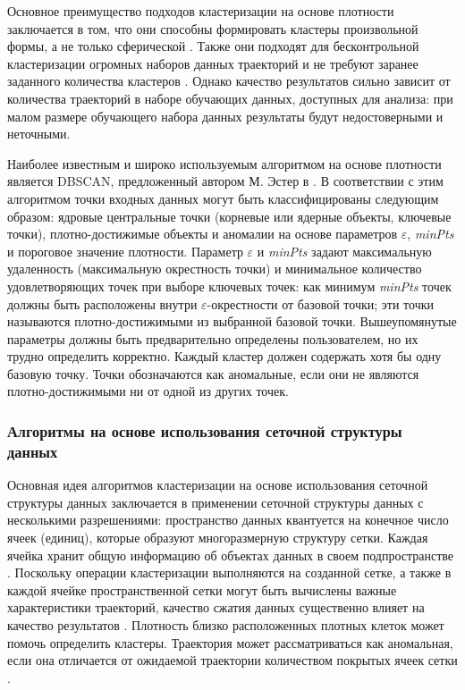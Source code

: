 Основное преимущество подходов кластеризации на основе плотности заключается в том, что они способны формировать кластеры произвольной формы, а не только сферической \cite{article:8_review_mot_cl_alg}. Также они подходят для бесконтрольной кластеризации огромных наборов данных траекторий и не требуют заранее заданного количества кластеров \cite{article:5_survey_tbsa}\cite{article:22_survey_dscc}. Однако качество результатов сильно зависит от количества траекторий в наборе обучающих данных, доступных для анализа: при малом размере обучающего набора данных результаты будут недостоверными и неточными.

Наиболее известным и широко используемым алгоритмом на основе плотности является DBSCAN, предложенный автором М. Эстер в \cite{inproceedings:20_dbscan}. В соответствии с этим алгоритмом точки входных данных могут быть классифицированы следующим образом: ядровые центральные точки (корневые или ядерные объекты, ключевые точки), плотно-достижимые объекты и аномалии на основе параметров $\varepsilon$, \textit{minPts} и пороговое значение плотности. Параметр $\varepsilon$ и \textit{minPts} задают максимальную удаленность (максимальную окрестность точки) и минимальное количество удовлетворяющих точек при выборе ключевых точек: как минимум \textit{minPts} точек должны быть расположены внутри $\varepsilon$-окрестности от базовой точки; эти точки называются плотно-достижимыми из выбранной базовой точки. Вышеупомянутые параметры должны быть предварительно определены пользователем, но их трудно определить корректно. Каждый кластер должен содержать хотя бы одну базовую точку. Точки обозначаются как аномальные, если они не являются плотно-достижимыми ни от одной из других точек.

\subsubsection{Алгоритмы на основе использования сеточной структуры данных}

Основная идея алгоритмов кластеризации на основе использования сеточной структуры данных заключается в применении сеточной структуры данных с несколькими разрешениями: пространство данных квантуется на конечное число ячеек (единиц), которые образуют многоразмерную структуру сетки. Каждая ячейка хранит общую информацию об объектах данных в своем подпространстве \cite{article:22_survey_dscc}. Поскольку операции кластеризации выполняются на созданной сетке, а также в каждой ячейке пространственной сетки могут быть вычислены важные характеристики траекторий, качество сжатия данных существенно влияет на качество результатов \cite{article:1_survey_stdm}. Плотность близко расположенных плотных клеток может помочь определить кластеры. Траектория может рассматриваться как аномальная, если она отличается от ожидаемой траектории количеством покрытых ячеек сетки \cite{article:22_survey_dscc}.

